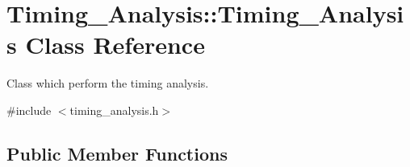 \hypertarget{classTiming__Analysis_1_1Timing__Analysis}{\section{Timing\-\_\-\-Analysis\-:\-:Timing\-\_\-\-Analysis Class Reference}
\label{classTiming__Analysis_1_1Timing__Analysis}
}


Class which perform the timing analysis.  




{\ttfamily \#include $<$timing\-\_\-analysis.\-h$>$}

\subsection*{Public Member Functions}
